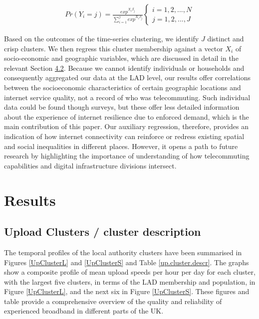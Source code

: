 \documentclass[]{interact}
\theoremstyle{plain}%
\theoremstyle{definition}
\theoremstyle{remark}
\begin{document}
\begin{align}
Pr(Y_{i}=j) = \frac{exp^{X_{i}\beta_{j}}}{\sum_{i=1}^j exp^{X_{i}\beta_{j}}}
\begin{cases}
    i = 1, 2, ... , N \\  
    j = 1, 2, ... , J
\end{cases}\label{eq1}
\end{align}

Based on the outcomes of the time-series clustering, we identify \(J\)
distinct and crisp clusters. We then regress this cluster membership
against a vector \(X_{i}\) of socio-economic and geographic variables,
which are discussed in detail in the relevant Section
\protect\hyperlink{sec:4.2}{4.2}. Because we cannot identify individuals
or households and consequently aggregated our data at the LAD level, our
results offer correlations between the socioeconomic characteristics of
certain geographic locations and internet service quality, not a record
of who was telecommuting. Such individual data could be found though
surveys, but these offer less detailed information about the experience
of internet resilience due to enforced demand, which is the main
contribution of this paper. Our auxiliary regression, therefore,
provides an indication of how internet connectivity can reinforce or
redress existing spatial and social inequalities in different places.
However, it opens a path to future research by highlighting the
importance of understanding of how telecommuting capabilities and
digital infrastructure divisions intersect.

\hypertarget{sec:4}{%
\section{Results}\label{sec:4}}

\hypertarget{sec:4.1}{%
\subsection{Upload Clusters / cluster description}\label{sec:4.1}}

The temporal profiles of the local authority clusters have been
summarised in Figures \ref{UpClusterL} and \ref{UpClusterS} and Table
\ref{up.cluster.descr}. The graphs show a composite profile of mean
upload speeds per hour per day for each cluster, with the largest five
clusters, in terms of the LAD membership and population, in Figure
\ref{UpClusterL}, and the next six in Figure \ref{UpClusterS}. These
figures and table provide a comprehensive overview of the quality and
reliability of experienced broadband in different parts of the UK.
\end{document}
